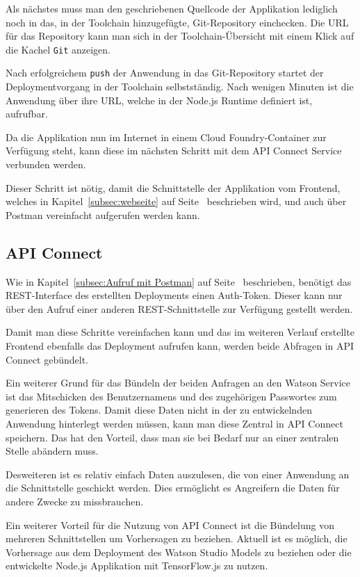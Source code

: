 Als nächstes muss man den geschriebenen Quellcode der Applikation lediglich noch in das, in der Toolchain hinzugefügte,
Git-Repository einchecken. Die URL für das Repository kann man sich in der Toolchain-Übersicht mit einem Klick auf die
Kachel \texttt{Git} anzeigen.

Nach erfolgreichem \texttt{push} der Anwendung in das Git-Repository startet der Deploymentvorgang in der Toolchain
selbstständig. Nach wenigen Minuten ist die Anwendung über ihre URL, welche in der Node.js Runtime definiert ist,
aufrufbar.

Da die Applikation nun im Internet in einem Cloud Foundry-Container zur Verfügung steht, kann diese im nächsten Schritt
mit dem API Connect Service verbunden werden.

Dieser Schritt ist nötig, damit die Schnittstelle der Applikation vom Frontend, welches in Kapitel~\ref{subsec:webseite}
auf Seite~\pageref{subsec:webseite} beschrieben wird, und auch über Postman vereinfacht aufgerufen werden kann.

\subsection{API Connect}
\label{subsec:apiconnect}
Wie in Kapitel~\ref{subsec:Aufruf mit Postman} auf Seite~\pageref{subsec:Aufruf mit Postman} beschrieben, benötigt das
REST-Interface des erstellten Deployments einen Auth-Token. Dieser kann nur über den Aufruf einer anderen
REST-Schnittstelle zur Verfügung gestellt werden.

Damit man diese Schritte vereinfachen kann und das im weiteren Verlauf erstellte Frontend ebenfalls das Deployment
aufrufen kann, werden beide Abfragen in API Connect gebündelt.

Ein weiterer Grund für das Bündeln der beiden Anfragen an den Watson Service ist das Mitschicken des Benutzernamens und
des zugehörigen Passwortes zum generieren des Tokens. Damit diese Daten nicht in der zu entwickelnden Anwendung hinterlegt
werden müssen, kann man diese Zentral in API Connect speichern. Das hat den Vorteil, dass man sie bei Bedarf nur an einer
zentralen Stelle abändern muss.

Desweiteren ist es relativ einfach Daten auszulesen, die von einer Anwendung an die Schnittstelle geschickt werden. Dies
ermöglicht es Angreifern die Daten für andere Zwecke zu missbrauchen.

Ein weiterer Vorteil für die Nutzung von API Connect ist die Bündelung von mehreren Schnittstellen um Vorhersagen zu
beziehen. Aktuell ist es möglich, die Vorhersage aus dem Deployment des Watson Studio Models zu beziehen oder die
entwickelte Node.js Applikation mit TensorFlow.js zu nutzen.

